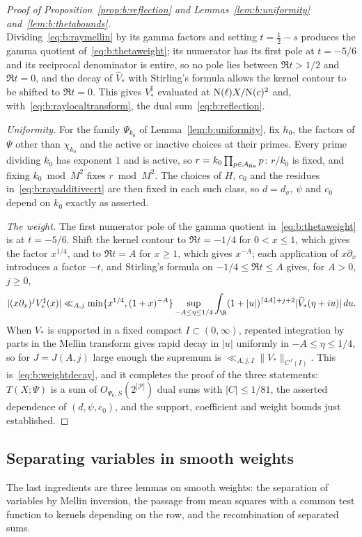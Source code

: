 \begin{proof}[Proof of Proposition~\ref{prop:b:reflection} and Lemmas~\ref{lem:b:uniformity} and~\ref{lem:b:thetabounds}]
\[\]
Dividing~\eqref{eq:b:raymellin} by its gamma factors and setting $t=\frac12-s$ produces the gamma quotient of~\eqref{eq:b:thetaweight}; its numerator has its first pole at $t=-5/6$ and its reciprocal denominator is entire, so no pole lies between $\Re t>1/2$ and $\Re t=0$, and the decay of $\widehat V_*$ with Stirling's formula allows the kernel contour to be shifted to $\Re t=0$. This gives $V_*^\sharp$ evaluated at $\mathrm{N}(\ell)X/\mathrm{N}(c)^2$ and, with~\eqref{eq:b:raylocaltransform}, the dual sum~\eqref{eq:b:reflection}.

\emph{Uniformity.} For the family $\Psi_{k_0}$ of Lemma~\ref{lem:b:uniformity}, fix $h_0$, the factors of $\Psi$ other than $\chi_{k_0}$ and the active or inactive choices at their primes. Every prime dividing $k_0$ has exponent $1$ and is active, so $r=k_0\prod_{p\in\mathcal A_{\rm fix}}p$: $r/k_0$ is fixed, and fixing $k_0\bmod M^2$ fixes $r\bmod M^2$. The choices of $H$, $c_0$ and the residues in~\eqref{eq:b:rayadditivecrt} are then fixed in each such class, so $d=d_\sigma$, $\psi$ and $c_0$ depend on $k_0$ exactly as asserted.

\emph{The weight.} The first numerator pole of the gamma quotient in~\eqref{eq:b:thetaweight} is at $t=-5/6$. Shift the kernel contour to $\Re t=-1/4$ for $0<x\le1$, which gives the factor $x^{1/4}$, and to $\Re t=A$ for $x\ge1$, which gives $x^{-A}$; each application of $x\partial_x$ introduces a factor $-t$, and Stirling's formula on $-1/4\le\Re t\le A$ gives, for $A>0$, $j\ge0$,
\[
  |(x\partial_x)^jV_*^\sharp(x)|\ll_{A,j}\min\{x^{1/4},(1+x)^{-A}\}\sup_{-A\le\eta\le1/4}\int_\R(1+|u|)^{\lceil4A\rceil+j+2}|\widehat V_*(\eta+iu)|\dd u.
\]
When $V_*$ is supported in a fixed compact $I\subset(0,\infty)$, repeated integration by parts in the Mellin transform gives rapid decay in $|u|$ uniformly in $-A\le\eta\le1/4$, so for $J=J(A,j)$ large enough the supremum is $\ll_{A,j,I}\|V_*\|_{C^J(I)}$. This is~\eqref{eq:b:weightdecay}, and it completes the proof of the three statements: $T(X;\Psi)$ is a sum of $O_{\Psi_0,S}(2^{|\mathcal P|})$ dual sums with $|C|\le1/81$, the asserted dependence of $(d,\psi,c_0)$, and the support, coefficient and weight bounds just established.
\end{proof}

\subsection{Separating variables in smooth weights}\label{ssec:b:weights}

The last ingredients are three lemmas on smooth weights: the separation of variables by Mellin inversion, the passage from mean squares with a common test function to kernels depending on the row, and the recombination of separated sums.

